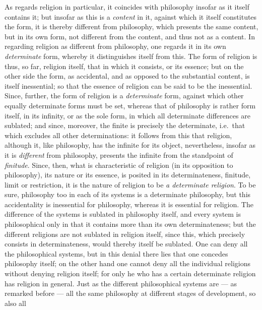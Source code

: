 \documentclass[12pt,a4paper,openany]{book}
\newcommand{\opage}[1]{\marginnote{\footnotesize\textit{[#1]}}}
\begin{document}
\setcounter{footnote}{0}%
\opage{151}As regards religion in particular, it coincides with philosophy insofar as it itself
contains it; but insofar as this is a \emph{content} in it, against which it itself
constitutes the form, it is thereby different from philosophy, which presents the
same content, but in its own form, not different from the content, and thus not as a
content. In regarding religion as different from philosophy, one regards it in its
own \emph{determinate} form, whereby it distinguishes itself from this. The form of
religion is thus, so far, religion itself, that in which it consists, or its essence;
but on the other side the form, as accidental, and as opposed to the substantial
content, is itself inessential; so that the essence of religion can be said to be the
inessential. Since, further, the form of religion is a \emph{determinate} form,
against which other equally determinate forms must be set, whereas that of philosophy
is rather form itself, in its infinity, or as the sole form, in which all determinate
differences are sublated; and since, moreover, the finite is precisely the
determinate, i.e.\ that which excludes all other determinations: it follows from this
that religion, although it, like philosophy, has the infinite for its object,
nevertheless, insofar as it is \emph{different} from philosophy, presents the
infinite from the standpoint of \emph{finitude}. Since, then, what is characteristic
of religion (in its opposition to philosophy), its nature or its essence, is posited
in its determinateness, finitude, limit or restriction, it is the nature of religion
to be \emph{a determinate religion}. To be sure, philosophy too in each of its
systems is a determinate philosophy, but this accidentality is inessential for
philosophy, whereas it is essential for religion. The difference of the systems is
sublated in philosophy itself, and every system is philosophical only in that it
contains more than its own determinateness; but the different religions are not
sublated in religion itself, since this, which precisely
\setcounter{footnote}{0}%
\opage{152}consists in determinateness, would thereby itself be sublated. One can deny all
the philosophical systems, but in this denial there lies that one concedes philosophy
itself; on the other hand one cannot deny all the individual religions without
denying religion itself; for only he who has a certain determinate religion has
religion in general. Just as the different philosophical systems are --- as remarked
before --- all the same philosophy at different stages of development, so also all
\end{document}
